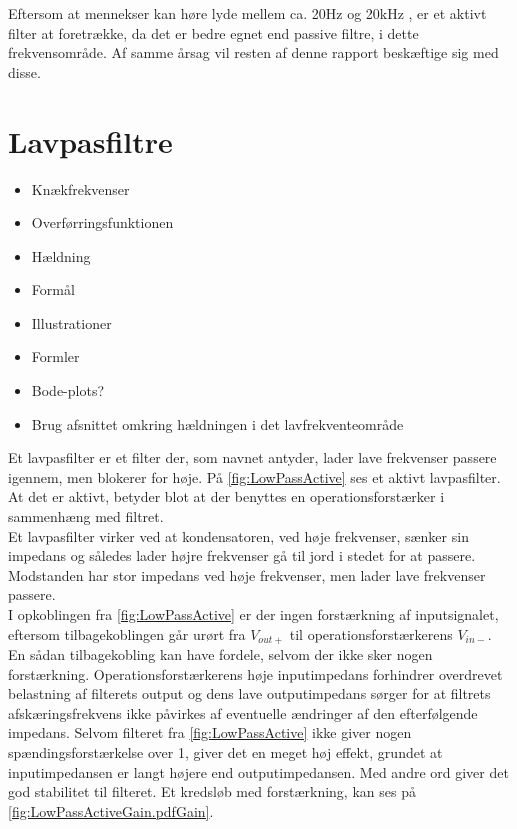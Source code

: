 \noindent
%
Eftersom at mennekser kan høre lyde mellem ca. 20Hz og 20kHz \fxsource, er et aktivt filter at foretrække, da det er bedre egnet end passive filtre, i dette frekvensområde. Af samme årsag vil resten af denne rapport beskæftige sig med disse.
%
%
%
\section{Lavpasfiltre}
\label{Lavpasfiltre}
\begin{itemize}
  \item Knækfrekvenser
  \item Overførringsfunktionen
  \item Hældning 
  \item Formål 
  \item Illustrationer
  \item Formler
  \item Bode-plots?
  \item Brug afsnittet omkring hældningen i det lavfrekventeområde
\end{itemize}
Et lavpasfilter er et filter der, som navnet antyder, lader lave frekvenser passere igennem, men blokerer for høje. På \autoref{fig:LowPassActive} ses et aktivt lavpasfilter. At det er aktivt, betyder blot at der benyttes en operationsforstærker i sammenhæng med filtret.\\
Et lavpasfilter virker ved at kondensatoren, ved høje frekvenser, sænker sin impedans og således lader højre frekvenser gå til jord i stedet for at passere. Modstanden har stor impedans ved høje frekvenser, men lader lave frekvenser passere.\\
I opkoblingen fra \autoref{fig:LowPassActive} er der ingen forstærkning af inputsignalet, eftersom tilbagekoblingen går urørt fra $V_{out+}$ til operationsforstærkerens $V_{in-}$. En sådan tilbagekobling kan have fordele, selvom der ikke sker nogen forstærkning. Operationsforstærkerens høje inputimpedans forhindrer overdrevet belastning af filterets output og dens lave outputimpedans sørger for at filtrets afskæringsfrekvens ikke påvirkes af eventuelle ændringer af den efterfølgende impedans. Selvom filteret fra \autoref{fig:LowPassActive} ikke giver nogen spændingsforstærkelse over 1, giver det en meget høj effekt, grundet at inputimpedansen er langt højere end outputimpedansen. Med andre ord giver det god stabilitet til filteret. Et kredsløb med forstærkning, kan ses på \autoref{fig:LowPassActiveGain.pdfGain}.
%
